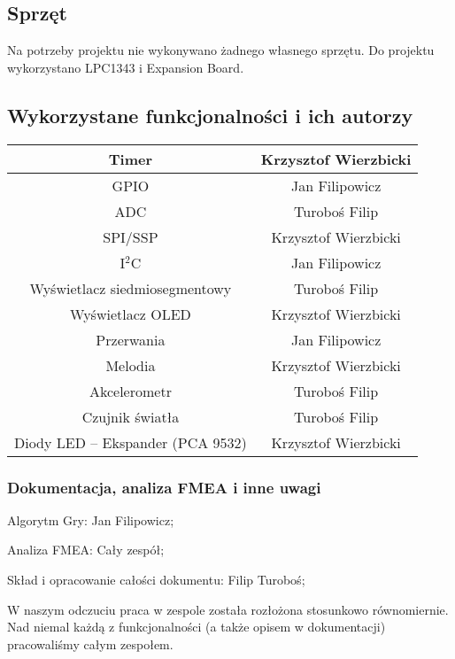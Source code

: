\documentclass[a4paper,12pt,twoside]{article}
\theoremstyle{plain}
\theoremstyle{definition}
\theoremstyle{remark}
\begin{document}
\subsection{Sprzęt}
Na potrzeby projektu nie wykonywano żadnego własnego sprzętu.
Do projektu wykorzystano LPC1343 i Expansion Board.
\subsection{Wykorzystane funkcjonalności i ich autorzy}

\begin{tabular}{|c|c|} \hline
	 Timer&{Krzysztof Wierzbicki}\\ \hline
	 GPIO&{Jan Filipowicz}\\ \hline
	 ADC&{Turoboś Filip}\\ \hline
	 SPI/SSP&{Krzysztof Wierzbicki}\\ \hline
	 I$^2$C&{Jan Filipowicz}\\ \hline
	 Wyświetlacz siedmiosegmentowy&{Turoboś Filip}\\ \hline
	 Wyświetlacz OLED&{Krzysztof Wierzbicki}\\ \hline
	 Przerwania&{Jan Filipowicz}\\ \hline
	 Melodia&{Krzysztof Wierzbicki}\\ \hline
	 Akcelerometr&{Turoboś Filip}\\ \hline
	 Czujnik światła&{Turoboś Filip}\\ \hline
	 Diody LED -- Ekspander (PCA 9532)&{Krzysztof Wierzbicki}\\ \hline
\end{tabular}
\subsubsection{Dokumentacja, analiza FMEA i inne uwagi}
Algorytm Gry: Jan Filipowicz;

\noindent Analiza FMEA: Cały zespół;

\noindent Skład i opracowanie całości dokumentu: Filip Turoboś;

W naszym odczuciu praca w zespole została rozłożona stosunkowo równomiernie. Nad niemal każdą z funkcjonalności (a także opisem w dokumentacji) pracowaliśmy całym zespołem.
\end{document}
